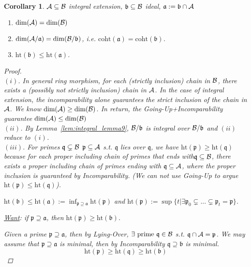 \documentclass[11pt]{article}
\newtheorem{cor}[thm]{Corollary}
\newcommand{\sca}{{\mathfrak a}}
\newcommand{\scb}{{\mathfrak b}}
\newcommand{\scp}{{\mathfrak p}}
\newcommand{\scq}{\mathfrak q}
\newcommand{\cala}{{\cal A}}
\newcommand{\calb}{{\cal B}}
\begin{document}
\begin{cor}
$\cala\subseteq\calb$ integral extension, $\scb\subseteq\calb$ ideal, $\sca:=\scb\cap\cala$
\begin{enumerate}[label=(\roman*)]
\item $\text{dim}(\cala)=\text{dim}(\calb)$
\item $\text{dim}(\cala/\sca)= \text{dim}(\calb/\scb)$, i.e. $\text{coht}(\sca)=\text{coht}(\scb)$.
\item $\text{ht}(\scb)\leq \text{ht}(\sca)$.
\end{enumerate}
\begin{proof}\ \\
$(i)$\checkmark. In general ring morphism, for each (strictly inclusion) chain in $\calb$, there exists a (possibly not strictly inclusion) chain  in $\cala$. In the case of integral extension, the incomparability alone guarantees the strict inclusion of the chain in $\cala$. We know $\text{dim}(\cala)\geq \text{dim}(\calb)$. In return, the Going-Up+Incomparability guarantee $\text{dim}(\cala)\leq\text{dim}(\calb) $ \\ 
$(ii)$\checkmark. By Lemma~\ref{lem:integral_lemma9}, $\calb/\scb$ is integral over $\calb/\scb$ and $(ii)$ reduce to $(i)$.\\
$(iii)$. For primes $\scq\subsetneq\calb$ $\scp\subseteq \cala$ s.t. $\scq$ lies over $\scq$, we have $\text{ht}(\scp)\geq \text{ht}(\scq)$ because for each proper including chain of primes that ends with$\scq\subseteq\calb$, there exists a proper including chain of primes ending with $\scq\subseteq\cala$, where the proper inclusion is guaranteed by Incomparability. (We can not use Going-Up to argue $\text{ht}(\scp)\leq \text{ht}(\scq)$).

 $\text{ht}(\scb)\leq \text{ht}(\sca):=\inf_{\scp\supseteq \sca} \text{ht}(\scp)$ and $\text{ht}(\scp):=\sup\{t|\exists \scp_0\subsetneq...\subsetneq\scp_t=\scp\}$. 

\underline{Want}: if $\scp\supseteq \sca$, then $\text{ht}(\scp)\geq \text{ht}(\scb)$.

Given a prime $\scp\supseteq\sca$, then by Lying-Over,  $\exists\text{ prime } \scq\in\calb$ s.t. $\scq\cap\cala=\scp$. We may assume that $\scp\supseteq\sca$ is minimal, then by Incomparability $\scq\supseteq\scb$ is minimal.
$$
\text{ht}(\scp)\geq \text{ht}(\scq)\geq \text{ht}(\scb)
$$ 
\end{proof}
\end{cor}
\end{document}
